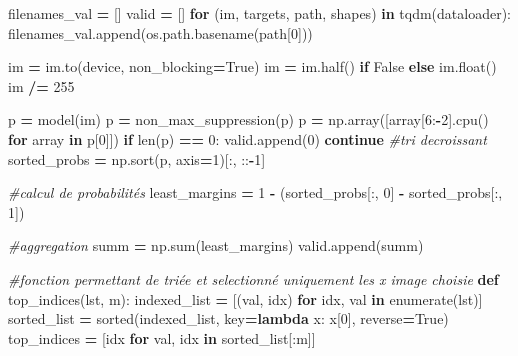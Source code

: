 \documentclass[
  10pt,
]{article}
\newenvironment{Shaded}{\begin{snugshade}}{\end{snugshade}}
\newcommand{\BuiltInTok}[1]{#1}
\newcommand{\CommentTok}[1]{\textcolor[rgb]{0.56,0.35,0.01}{\textit{#1}}}
\newcommand{\ControlFlowTok}[1]{\textcolor[rgb]{0.13,0.29,0.53}{\textbf{#1}}}
\newcommand{\DecValTok}[1]{\textcolor[rgb]{0.00,0.00,0.81}{#1}}
\newcommand{\KeywordTok}[1]{\textcolor[rgb]{0.13,0.29,0.53}{\textbf{#1}}}
\newcommand{\NormalTok}[1]{#1}
\newcommand{\OperatorTok}[1]{\textcolor[rgb]{0.81,0.36,0.00}{\textbf{#1}}}
\newcommand{\VariableTok}[1]{\textcolor[rgb]{0.00,0.00,0.00}{#1}}
\begin{document}
\begin{Shaded}
\begin{Highlighting}[]

\NormalTok{filenames\_val }\OperatorTok{=}\NormalTok{ []}
\NormalTok{valid }\OperatorTok{=}\NormalTok{ []}
\ControlFlowTok{for}\NormalTok{ (im, targets, path, shapes) }\KeywordTok{in}\NormalTok{ tqdm(dataloader):}
\NormalTok{    filenames\_val.append(os.path.basename(path[}\DecValTok{0}\NormalTok{]))}

\NormalTok{    im }\OperatorTok{=}\NormalTok{ im.to(device, non\_blocking}\OperatorTok{=}\VariableTok{True}\NormalTok{)}
\NormalTok{    im }\OperatorTok{=}\NormalTok{ im.half() }\ControlFlowTok{if} \VariableTok{False} \ControlFlowTok{else}\NormalTok{ im.}\BuiltInTok{float}\NormalTok{()}
\NormalTok{    im }\OperatorTok{/=} \DecValTok{255}

\NormalTok{    p }\OperatorTok{=}\NormalTok{ model(im)}
\NormalTok{    p }\OperatorTok{=}\NormalTok{ non\_max\_suppression(p)}
\NormalTok{    p }\OperatorTok{=}\NormalTok{ np.array([array[}\DecValTok{6}\NormalTok{:}\OperatorTok{{-}}\DecValTok{2}\NormalTok{].cpu() }\ControlFlowTok{for}\NormalTok{ array }\KeywordTok{in}\NormalTok{ p[}\DecValTok{0}\NormalTok{]])}
    \ControlFlowTok{if} \BuiltInTok{len}\NormalTok{(p) }\OperatorTok{==} \DecValTok{0}\NormalTok{:}
\NormalTok{        valid.append(}\DecValTok{0}\NormalTok{)}
        \ControlFlowTok{continue}
    \CommentTok{\#tri decroissant}
\NormalTok{    sorted\_probs }\OperatorTok{=}\NormalTok{ np.sort(p, axis}\OperatorTok{=}\DecValTok{1}\NormalTok{)[:, ::}\OperatorTok{{-}}\DecValTok{1}\NormalTok{]}
    
    \CommentTok{\#calcul de probabilités}
\NormalTok{    least\_margins }\OperatorTok{=} \DecValTok{1} \OperatorTok{{-}}\NormalTok{ (sorted\_probs[:, }\DecValTok{0}\NormalTok{] }\OperatorTok{{-}}\NormalTok{ sorted\_probs[:, }\DecValTok{1}\NormalTok{])}
    
    \CommentTok{\#aggregation}
\NormalTok{    summ }\OperatorTok{=}\NormalTok{ np.}\BuiltInTok{sum}\NormalTok{(least\_margins)}
\NormalTok{    valid.append(summ)}
    
\CommentTok{\#fonction permettant de triée et selectionné uniquement les x image choisie    }
\KeywordTok{def}\NormalTok{ top\_indices(lst, m):}
\NormalTok{    indexed\_list }\OperatorTok{=}\NormalTok{ [(val, idx) }\ControlFlowTok{for}\NormalTok{ idx, val }\KeywordTok{in} \BuiltInTok{enumerate}\NormalTok{(lst)]}
\NormalTok{    sorted\_list }\OperatorTok{=} \BuiltInTok{sorted}\NormalTok{(indexed\_list, key}\OperatorTok{=}\KeywordTok{lambda}\NormalTok{ x: x[}\DecValTok{0}\NormalTok{], reverse}\OperatorTok{=}\VariableTok{True}\NormalTok{)}
\NormalTok{    top\_indices }\OperatorTok{=}\NormalTok{ [idx }\ControlFlowTok{for}\NormalTok{ val, idx }\KeywordTok{in}\NormalTok{ sorted\_list[:m]]}


\end{Highlighting}
\end{Shaded}
\end{document}
